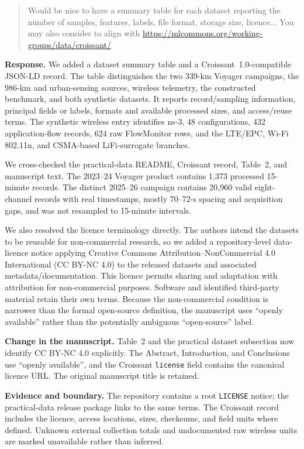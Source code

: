\documentclass[11pt]{article}
\newenvironment{reviewercomment}{\begin{quote}\color{reviewblue}}{\end{quote}}
\newenvironment{authorresponse}{\color{responsegreen}\textbf{Response.} }{\par\color{black}}
\newcommand{\change}[1]{\par\textbf{Change in the manuscript.} #1\par}
\newcommand{\evidence}[1]{\par\textbf{Evidence and boundary.} #1\par}
\begin{document}
\begin{reviewercomment}
\textbullet{} Would be nice to have a summary table for each dataset reporting the number of samples, features, labels, file format, storage size, licence... You may also consider to align with \url{https://mlcommons.org/working-groups/data/croissant/}
\end{reviewercomment}
\begin{authorresponse}
We added a dataset summary table and a Croissant~1.0-compatible JSON-LD record. The table distinguishes the two 339-km Voyager campaigns, the 986-km and urban-sensing sources, wireless telemetry, the constructed benchmark, and both synthetic datasets. It reports record/sampling information, principal fields or labels, formats and available processed sizes, and access/reuse terms. The synthetic wireless entry identifies ns-3, 48 configurations, 432 application-flow records, 624 raw FlowMonitor rows, and the LTE/EPC, Wi-Fi 802.11n, and CSMA-based LiFi-surrogate branches.

We cross-checked the practical-data README, Croissant record, Table~2, and manuscript text. The 2023--24 Voyager product contains 1,373 processed 15-minute records. The distinct 2025--26 campaign contains 20,960 valid eight-channel records with real timestamps, mostly 70--72-s spacing and acquisition gaps, and was not resampled to 15-minute intervals.

We also resolved the licence terminology directly. The authors intend the datasets to be reusable for non-commercial research, so we added a repository-level data-licence notice applying Creative Commons Attribution--NonCommercial 4.0 International (CC BY-NC 4.0) to the released datasets and associated metadata/documentation. This licence permits sharing and adaptation with attribution for non-commercial purposes. Software and identified third-party material retain their own terms. Because the non-commercial condition is narrower than the formal open-source definition, the manuscript uses ``openly available'' rather than the potentially ambiguous ``open-source'' label.
\end{authorresponse}
\change{Table~2 and the practical dataset subsection now identify CC BY-NC 4.0 explicitly. The Abstract, Introduction, and Conclusions use ``openly available'', and the Croissant \texttt{license} field contains the canonical licence URL. The original manuscript title is retained.}
\evidence{The repository contains a root \texttt{LICENSE} notice; the practical-data release package links to the same terms. The Croissant record includes the licence, access locations, sizes, checksums, and field units where defined. Unknown external collection totals and undocumented raw wireless units are marked unavailable rather than inferred.}
\end{document}

